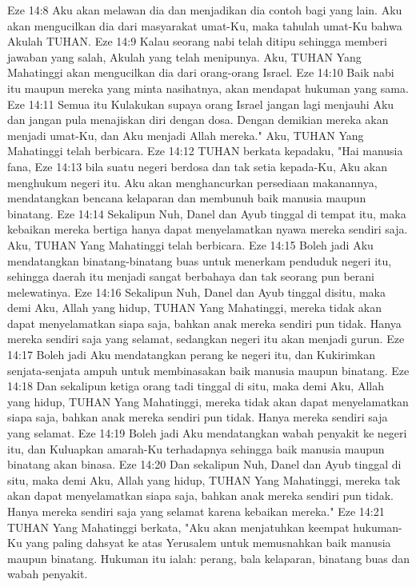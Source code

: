 Eze 14:8  Aku akan melawan dia dan menjadikan dia contoh bagi yang lain. Aku akan mengucilkan dia dari masyarakat umat-Ku, maka tahulah umat-Ku bahwa Akulah TUHAN.
Eze 14:9  Kalau seorang nabi telah ditipu sehingga memberi jawaban yang salah, Akulah yang telah menipunya. Aku, TUHAN Yang Mahatinggi akan mengucilkan dia dari orang-orang Israel.
Eze 14:10  Baik nabi itu maupun mereka yang minta nasihatnya, akan mendapat hukuman yang sama.
Eze 14:11  Semua itu Kulakukan supaya orang Israel jangan lagi menjauhi Aku dan jangan pula menajiskan diri dengan dosa. Dengan demikian mereka akan menjadi umat-Ku, dan Aku menjadi Allah mereka." Aku, TUHAN Yang Mahatinggi telah berbicara.
Eze 14:12  TUHAN berkata kepadaku, "Hai manusia fana,
Eze 14:13  bila suatu negeri berdosa dan tak setia kepada-Ku, Aku akan menghukum negeri itu. Aku akan menghancurkan persediaan makanannya, mendatangkan bencana kelaparan dan membunuh baik manusia maupun binatang.
Eze 14:14  Sekalipun Nuh, Danel dan Ayub tinggal di tempat itu, maka kebaikan mereka bertiga hanya dapat menyelamatkan nyawa mereka sendiri saja. Aku, TUHAN Yang Mahatinggi telah berbicara.
Eze 14:15  Boleh jadi Aku mendatangkan binatang-binatang buas untuk menerkam penduduk negeri itu, sehingga daerah itu menjadi sangat berbahaya dan tak seorang pun berani melewatinya.
Eze 14:16  Sekalipun Nuh, Danel dan Ayub tinggal disitu, maka demi Aku, Allah yang hidup, TUHAN Yang Mahatinggi, mereka tidak akan dapat menyelamatkan siapa saja, bahkan anak mereka sendiri pun tidak. Hanya mereka sendiri saja yang selamat, sedangkan negeri itu akan menjadi gurun.
Eze 14:17  Boleh jadi Aku mendatangkan perang ke negeri itu, dan Kukirimkan senjata-senjata ampuh untuk membinasakan baik manusia maupun binatang.
Eze 14:18  Dan sekalipun ketiga orang tadi tinggal di situ, maka demi Aku, Allah yang hidup, TUHAN Yang Mahatinggi, mereka tidak akan dapat menyelamatkan siapa saja, bahkan anak mereka sendiri pun tidak. Hanya mereka sendiri saja yang selamat.
Eze 14:19  Boleh jadi Aku mendatangkan wabah penyakit ke negeri itu, dan Kuluapkan amarah-Ku terhadapnya sehingga baik manusia maupun binatang akan binasa.
Eze 14:20  Dan sekalipun Nuh, Danel dan Ayub tinggal di situ, maka demi Aku, Allah yang hidup, TUHAN Yang Mahatinggi, mereka tak akan dapat menyelamatkan siapa saja, bahkan anak mereka sendiri pun tidak. Hanya mereka sendiri saja yang selamat karena kebaikan mereka."
Eze 14:21  TUHAN Yang Mahatinggi berkata, "Aku akan menjatuhkan keempat hukuman-Ku yang paling dahsyat ke atas Yerusalem untuk memusnahkan baik manusia maupun binatang. Hukuman itu ialah: perang, bala kelaparan, binatang buas dan wabah penyakit.

